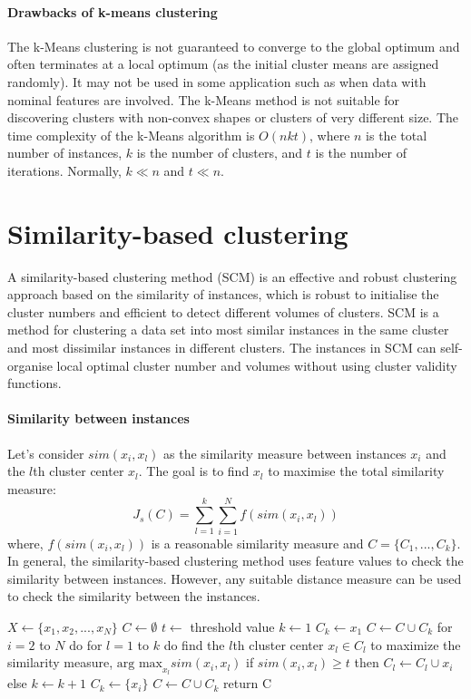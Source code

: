 \paragraph{Drawbacks of k-means clustering} The k-Means clustering is not guaranteed to converge to the global optimum and often terminates at a local optimum (as the initial cluster means are assigned randomly). It may not be used in some application such as when data with nominal features are involved. The k-Means method is not suitable for discovering clusters with non-convex shapes or clusters of very different size. The time complexity of the k-Means algorithm is $O(nkt)$, where $n$ is the total number of instances, $k$ is the number of clusters, and $t$ is the number of iterations. Normally, $k \ll n$ and $t \ll n$.
\section{Similarity-based clustering}
A similarity-based clustering method (SCM) is an effective and robust clustering approach based on the similarity of instances, which is robust
to initialise the cluster numbers and efficient to detect different volumes of clusters. SCM is a method for clustering a data set into most similar
instances in the same cluster and most dissimilar instances in different clusters. The instances in SCM can self-organise local optimal cluster
number and volumes without using cluster validity functions.

\paragraph{Similarity between instances}
Let’s consider $sim(x_i, x_l)$ as the similarity measure between instances $x_i$ and the $l$th cluster center $x_l$. The goal is to find $x_l$ to maximise the total similarity measure:
\begin{equation*}
    J_s (C) = \sum_{l=1}^k \sum_{i=1}^N f(sim(x_i, x_l))
\end{equation*}
where, $f(sim(x_i, x_l))$ is a reasonable similarity measure and $C = \{ C_1, ..., C_k \}$. In general, the similarity-based clustering method uses feature values to check the similarity between instances. However, any suitable distance measure can be used to check the similarity
between the instances.
\begin{algorithm}[caption={Similarity-based clustering.}, label={alg13}]
$X \leftarrow \{ x_1, x_2, ..., x_N \}$
$C \leftarrow \emptyset$
$t \leftarrow $ threshold value
$k \leftarrow 1$
$C_k \leftarrow {x_1}$
$C \leftarrow C \cup C_k$
for $i = 2$ to $N$ do
    for $l = 1$ to $k$ do
        find the $l$th cluster center $x_l \in C_l$ to maximize the similarity
measure, $\text{arg~max}_{x_l} sim(x_i, x_l)$
    if $sim(x_i, x_l) \geq t$ then
        $C_l \leftarrow C_l \cup x_i$
    else
        $k \leftarrow k+1$
        $C_k \leftarrow \{ x_i \}$
        $C \leftarrow C \cup C_k$
return C
\end{algorithm}
